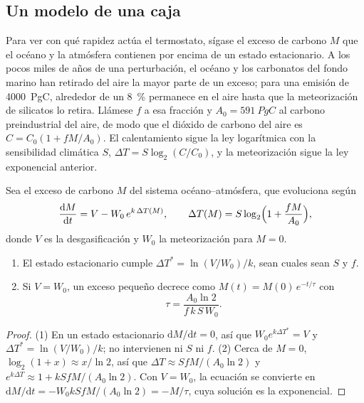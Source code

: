 \subsection*{Un modelo de una caja}

Para ver con qué rapidez actúa el termostato, sígase el exceso de carbono $M$ que el océano y la atmósfera
contienen por encima de un estado estacionario. A los pocos miles de años de una perturbación, el océano y los carbonatos
del fondo marino han retirado del aire la mayor parte de un exceso; para una emisión de \qty{4000}{PgC}, alrededor de un
\qty{8}{\percent} permanece en el aire hasta que la meteorización de silicatos lo retira. Llámese $f$ a esa
fracción y $A_0 = \qty{591}{PgC}$ al carbono preindustrial del aire, de modo que el dióxido de carbono
del aire es $C = C_0(1 + fM/A_0)$. El calentamiento sigue la ley logarítmica con la sensibilidad climática
$S$, $\Delta T = S\log_2(C/C_0)$, y la meteorización sigue la ley exponencial anterior.

\begin{proposition}\label{prop:b2:deep-time-climate:thermostat}
Sea el exceso de carbono $M$ del sistema océano--atmósfera, que evoluciona según
\[
  \frac{\mathrm dM}{\mathrm dt} = V - W_0\,e^{k\,\Delta T(M)}, \qquad
  \Delta T(M) = S\log_2\Bigl(1 + \frac{fM}{A_0}\Bigr),
\]
donde $V$ es la desgasificación y $W_0$ la meteorización para $M = 0$.
\begin{enumerate}
  \item El estado estacionario cumple $\Delta T^* = \ln(V/W_0)/k$, sean cuales sean $S$ y $f$.
  \item Si $V = W_0$, un exceso pequeño decrece como $M(t) = M(0)\,e^{-t/\tau}$ con
        \[
          \tau = \frac{A_0 \ln 2}{f\,k\,S\,W_0} .
        \]
\end{enumerate}
\end{proposition}

\begin{proof}
(1) En un estado estacionario $\mathrm dM/\mathrm dt = 0$, así que $W_0e^{k\Delta T^*} = V$ y $\Delta T^* =
\ln(V/W_0)/k$; no intervienen ni $S$ ni $f$. (2) Cerca de $M = 0$, $\log_2(1 + x) \approx x/\ln 2$, así que
$\Delta T \approx SfM/(A_0\ln 2)$ y $e^{k\Delta T} \approx 1 + kSfM/(A_0\ln2)$. Con $V = W_0$, la
ecuación se convierte en $\mathrm dM/\mathrm dt = -W_0kSfM/(A_0\ln 2) = -M/\tau$, cuya solución es la
exponencial.
\end{proof}

